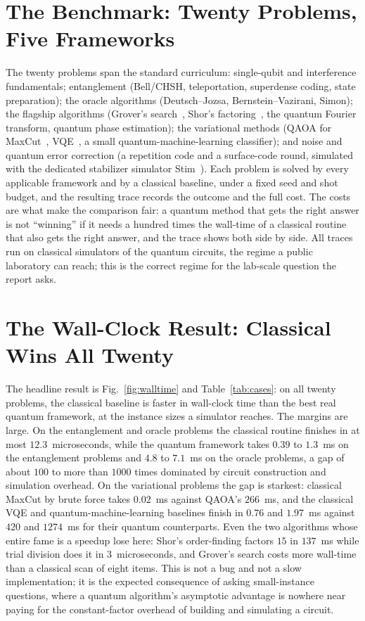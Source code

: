 \documentclass[journal]{IEEEtran}
\begin{document}
\section{The Benchmark: Twenty Problems, Five Frameworks}\label{sec:bench}

The twenty problems span the standard curriculum: single-qubit and interference fundamentals; entanglement
(Bell/CHSH, teleportation, superdense coding, state preparation); the oracle algorithms (Deutsch--Jozsa,
Bernstein--Vazirani, Simon); the flagship algorithms (Grover's search~\cite{grover}, Shor's
factoring~\cite{shor}, the quantum Fourier transform, quantum phase estimation); the variational methods (QAOA
for MaxCut~\cite{farhi}, VQE~\cite{peruzzo}, a small quantum-machine-learning classifier); and noise and quantum
error correction (a repetition code and a surface-code round, simulated with the dedicated stabilizer simulator
Stim~\cite{stim}). Each problem is solved by every applicable framework and by a classical baseline, under a
fixed seed and shot budget, and the resulting trace records the outcome and the full cost. The costs are what
make the comparison fair: a quantum method that gets the right answer is not ``winning'' if it needs a hundred
times the wall-time of a classical routine that also gets the right answer, and the trace shows both side by
side. All traces run on classical simulators of the quantum circuits, the regime a public laboratory can reach;
this is the correct regime for the lab-scale question the report asks.

\section{The Wall-Clock Result: Classical Wins All Twenty}\label{sec:walltime}

The headline result is Fig.~\ref{fig:walltime} and Table~\ref{tab:cases}: on all twenty problems, the classical
baseline is faster in wall-clock time than the best real quantum framework, at the instance sizes a simulator
reaches. The margins are large. On the entanglement and oracle problems the classical routine finishes in at most
$12.3$~microseconds, while the quantum framework takes $0.39$ to $1.3$~ms on the entanglement problems and $4.8$ to
$7.1$~ms on the oracle problems, a gap of about $100$ to more than $1000$ times dominated by circuit construction
and simulation overhead. On the variational problems the gap is starkest: classical MaxCut
by brute force takes $0.02$~ms against QAOA's $266$~ms, and the classical VQE and quantum-machine-learning
baselines finish in $0.76$ and $1.97$~ms against $420$ and $1274$~ms for their quantum counterparts. Even the two
algorithms whose entire fame is a speedup lose here: Shor's order-finding factors $15$ in $137$~ms while trial
division does it in $3$~microseconds, and Grover's search costs more wall-time than a classical scan of eight
items. This is not a bug and not a slow implementation; it is the expected consequence of asking
small-instance questions, where a quantum algorithm's asymptotic advantage is nowhere near paying for the
constant-factor overhead of building and simulating a circuit.
\end{document}
